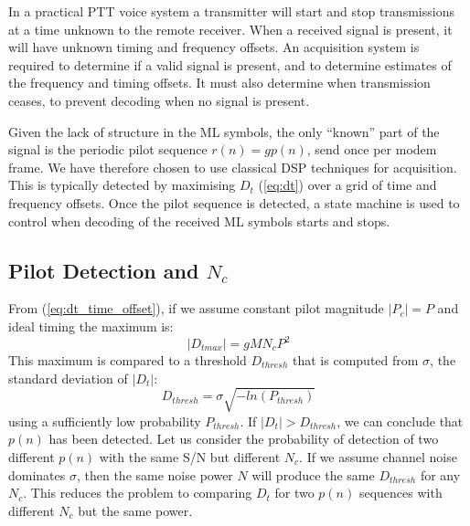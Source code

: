 \documentclass{article}
\begin{document}
In a practical PTT voice system a transmitter will start and stop transmissions at a time unknown to the remote receiver.  When a received signal is present, it will have unknown timing and frequency offsets. An acquisition system is required to determine if a valid signal is present, and to determine estimates of the frequency and timing offsets.  It must also determine when transmission ceases, to prevent decoding when no signal is present.
 
Given the lack of structure in the ML symbols, the only ``known'' part of the signal is the periodic pilot sequence $r(n)=gp(n)$, send once per modem frame.  We have therefore chosen to use classical DSP techniques for acquisition. This is typically detected by maximising $D_t$ (\ref{eq:dt}) over a grid of time and frequency offsets. Once the pilot sequence is detected, a state machine is used to control when decoding of the received ML symbols starts and stops.

\subsection{Pilot Detection and $N_c$}

From (\ref{eq:dt_time_offset}), if we assume constant pilot magnitude $|P_c|=P$ and ideal timing the maximum is:
\begin{equation}
|D_{tmax}| = g M N_c P^2
\end{equation}
This maximum is compared to a threshold $D_{thresh}$ that is computed from $\sigma$, the standard deviation of $|D_t|$:
\begin{equation}
\label{eq:corr_prob}
D_{thresh} = \sigma\sqrt{-ln(P_{thresh})}
\end{equation}
using a sufficiently low probability $P_{thresh}$. If $|D_t| > D_{thresh}$, we can conclude that $p(n)$ has been detected.  Let us consider the probability of detection of two different $p(n)$ with the same S/N but different $N_c$. If we assume channel noise dominates $\sigma$, then the same noise power $N$ will produce the same $D_{thresh}$ for any $N_c$.  This reduces the problem to comparing $D_t$ for two $p(n)$ sequences with different $N_c$ but the same power.
\end{document}
